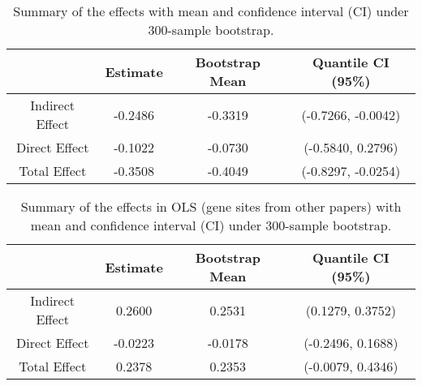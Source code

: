 \begin{table}[H]
\centering
\small 
\begin{tabular}{cccc}
\hline
\multicolumn{1}{c}{}                & \multicolumn{1}{c}{Estimate} & Bootstrap Mean&Quantile CI (95\%)\\ \hline
\multicolumn{1}{c}{Indirect Effect} & \multicolumn{1}{c}{-0.2486
}     & -0.3319&(-0.7266, -0.0042) 
\\ \hline
\multicolumn{1}{c}{Direct Effect} & \multicolumn{1}{c}{-0.1022
}     & -0.0730&(-0.5840, 0.2796) 
\\ \hline
\multicolumn{1}{c}{Total Effect} & \multicolumn{1}{c}{-0.3508}     & -0.4049&(-0.8297, -0.0254) \\ \hline
\end{tabular}
\caption{Summary of the effects with mean and confidence interval (CI) under 300-sample bootstrap.} 
\label{tab:results1}
\end{table}



\begin{table}[H]
\centering
\small 
\begin{tabular}{cccc}
\hline
\multicolumn{1}{c}{}                & \multicolumn{1}{c}{Estimate} & Bootstrap Mean&Quantile CI (95\%)\\ \hline
\multicolumn{1}{c}{Indirect Effect} & \multicolumn{1}{c}{0.2600
}     & 0.2531
&(0.1279, 0.3752) 
\\ \hline
\multicolumn{1}{c}{Direct Effect} & \multicolumn{1}{c}{-0.0223
}     & -0.0178
&(-0.2496, 0.1688) 
\\ \hline
\multicolumn{1}{c}{Total Effect} & \multicolumn{1}{c}{0.2378}     & 0.2353&(-0.0079, 0.4346) \\ \hline
\end{tabular}
\caption{Summary of the effects in OLS (gene sites from other papers) with mean and confidence interval (CI) under 300-sample bootstrap.} 
\label{tab:results2}
\end{table}
